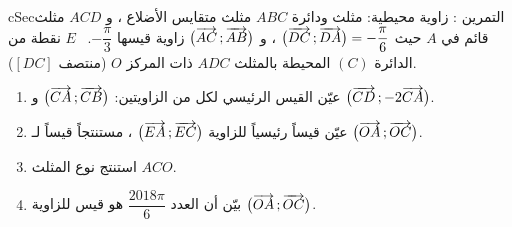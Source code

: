 \documentclass[12pt,a4paper]{article}
\newenvironment{BOX}[2]{\begin{otherlanguage}{english}\begin{arbox}{#1}{#2}}{\end{arbox}\end{otherlanguage}}
\newcounter{exo}
\newenvironment{tamrin}[1]{\stepcounter{exo}\begin{BOX}{cSec}{التمرين \theexo: #1}}{\end{BOX}}
\newenvironment{LTR}{\begin{otherlanguage}{english}}{\end{otherlanguage}}
\begin{document}
\begin{tamrin}{زاوية محيطية: مثلث ودائرة}
$ABC$ مثلث متقايس الأضلاع ، و $ACD$ مثلث قائم في $A$ حيث $\big(\overrightarrow{DC}\,;\overrightarrow{DA}\big)=-\dfrac{\pi}{6}$ ، و $\big(\overrightarrow{AC}\,;\overrightarrow{AB}\big)$ زاوية قيسها $-\dfrac{\pi}{3}$. \ $E$ نقطة من الدائرة $(C)$ المحيطة بالمثلث $ADC$ ذات المركز $O$ (منتصف $[DC]$).
\begin{center}\begin{LTR}
\end{LTR}\end{center}
\begin{enumerate}
\item عيّن القيس الرئيسي لكل من الزاويتين: $\big(\overrightarrow{CA}\,;\overrightarrow{CB}\big)$ و $\big(\overrightarrow{CD}\,;-2\overrightarrow{CA}\big)$.
\item عيّن قيساً رئيسياً للزاوية $\big(\overrightarrow{EA}\,;\overrightarrow{EC}\big)$ ، مستنتجاً قيساً لـ $\big(\overrightarrow{OA}\,;\overrightarrow{OC}\big)$.
\item استنتج نوع المثلث $ACO$.
\item بيّن أن العدد $\dfrac{2018\pi}{6}$ هو قيس للزاوية $\big(\overrightarrow{OA}\,;\overrightarrow{OC}\big)$.
\end{enumerate}
\end{tamrin}
\end{document}
